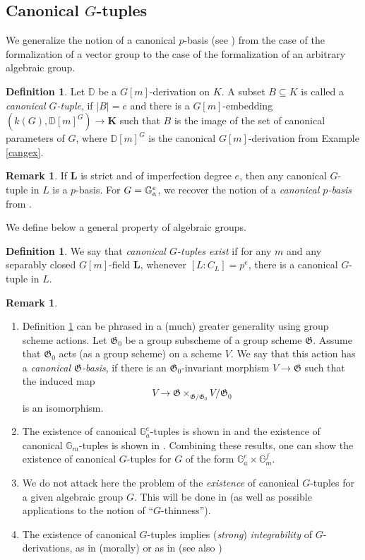 \documentclass[10pt]{amsart}
\theoremstyle{definition}
\newtheorem{definition}[theorem]{Definition}
\newtheorem{remark}[theorem]{Remark}
\begin{document}
\subsection{Canonical $G$-tuples}\label{secgtup}
We generalize the notion of a canonical $p$-basis (see \cite{Zieg2}) from the case of the formalization of a vector group to the case of the formalization of an arbitrary algebraic group.
\begin{definition}\label{defpbasis}
Let $\mathbb{D}$ be a $G[m]$-derivation on $K$.
A subset $B\subseteq K$ is called a \emph{canonical $G$-tuple}, if $|B|=e$ and there is a $G[m]$-embedding $(k(G),\mathbb{D}[m]^G)\to \mathbf{K}$ such that $B$ is the image of the set of canonical parameters of $G$, where $\mathbb{D}[m]^G$ is the canonical $G[m]$-derivation from Example \ref{cangex}.
\end{definition}
\begin{remark}\label{geotuple}
If $\mathbf{L}$ is strict and of imperfection degree $e$, then any canonical $G$-tuple in $L$ is a $p$-basis. For $G=\mathbb{G}_{\rm{a}}^e$, we recover the notion of a \emph{canonical $p$-basis} from \cite{Zieg2}.
\end{remark}
\noindent
We define below a general property of algebraic groups.
\begin{definition}\label{existence}
We say that \emph{canonical $G$-tuples exist} if for any $m$ and any separably closed $G[m]$-field $\mathbf{L}$, whenever $[L:C_L]=p^e$, there is a canonical $G$-tuple in $L$.
\end{definition}
\begin{remark}\label{greater}
\begin{enumerate}
\item Definition \ref{defpbasis} can be phrased in a (much) greater generality using group scheme actions.
Let $\mathfrak{G}_0$ be a group subscheme of a group scheme $\mathfrak{G}$. Assume that $\mathfrak{G}_0$ acts (as a group scheme) on a scheme $V$. We say that this action has a \emph{canonical $\mathfrak{G}$-basis}, if there is an $\mathfrak{G}_0$-invariant morphism $V\to \mathfrak{G}$ such that the induced map
$$V\to \mathfrak{G}\times_{\mathfrak{G}/\mathfrak{G}_0}V/\mathfrak{G}_0$$
is an isomorphism.

\item The existence of canonical $\mathbb{G}_a^e$-tuples is shown
in \cite{Zieg2} and the existence of
canonical $\mathbb{G}_m$-tuples is shown in \cite{HK1}. Combining these
results, one can show the existence of canonical $G$-tuples for $G$ of
the form $\mathbb{G}_a^e\times\mathbb{G}_m^f$.

\item We do not attack here the problem of the \emph{existence} of canonical $G$-tuples for a given algebraic group $G$. This will be done in \cite{Hoff1} (as well as possible applications to the notion of ``$G$-thinness'').

\item The existence of canonical $G$-tuples implies (\emph{strong}) \emph{integrability} of $G$-derivations, as in (morally) \cite{Mats1} or as in \cite{HK1} (see also \cite{Tyc})
\end{enumerate}
\end{remark}
\end{document}
